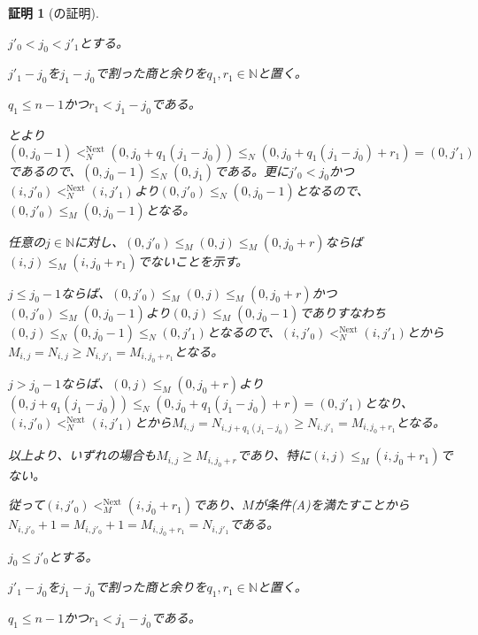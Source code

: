 \documentclass[dvipdfmx,uplatex]{jsarticle}
\theoremstyle{customnonumberbreakfortheorem}
\theoremstyle{customnonumberbreakforproof}
\newtheorem{hideableproof}{証明}
\begin{document}
\begin{hideableproof}[の証明]
\begin{indented}
\begin{indented}
			\item \(j'_0 < j_0 < j'_1\)とする。
			\begin{indented}
				\item \(j'_1-j_0\)を\(j_1-j_0\)で割った商と余りを\(q_1,r_1 \in \mathbb{N}\)と置く。
				\item \(q_1 \leq n-1\)かつ\(r_1 < j_1-j_0\)である。
				\item {}とより\((0,j_0-1) <_N^{\textrm{Next}} (0,j_0+q_1(j_1-j_0)) \leq_N (0,j_0+q_1(j_1-j_0)+r_1) = (0,j'_1)\)であるので、\((0,j_0-1) \leq_N (0,j_1)\)である。更に\(j'_0 < j_0\)かつ\((i,j'_0) <_N^{\textrm{Next}} (i,j'_1)\)より\((0,j'_0) \leq_N (0,j_0-1)\)となるので、\((0,j'_0) \leq_M (0,j_0-1)\)となる。
				\item 任意の\(j \in \mathbb{N}\)に対し、\((0,j'_0) \leq_M (0,j) \leq_M (0,j_0+r)\)ならば\((i,j) \leq_M (i,j_0+r_1)\)でないことを示す。
				\begin{indented}
					\item \(j \leq j_0-1\)ならば、\((0,j'_0) \leq_M (0,j) \leq_M (0,j_0+r)\)かつ\((0,j'_0) \leq_M (0,j_0-1)\)より\((0,j) \leq_M (0,j_0-1)\)でありすなわち\((0,j) \leq_N (0,j_0-1) \leq_N (0,j'_1)\)となるので、\((i,j'_0) <_N^{\textrm{Next}} (i,j'_1)\)とから\(M_{i,j} = N_{i,j} \geq N_{i,j'_1} = M_{i,j_0+r_1}\)となる。
					\item \(j > j_0-1\)ならば、\((0,j) \leq_M (0,j_0+r)\)より\((0,j+q_1(j_1-j_0)) \leq_N (0,j_0+q_1(j_1-j_0)+r) = (0,j'_1)\)となり、\((i,j'_0) <_N^{\textrm{Next}} (i,j'_1)\)とから\(M_{i,j} = N_{i,j+q_1(j_1-j_0)} \geq N_{i,j'_1} = M_{i,j_0+r_1}\)となる。
				\end{indented}
				\item 以上より、いずれの場合も\(M_{i,j} \geq M_{i,j_0+r}\)であり、特に\((i,j) \leq_M (i,j_0+r_1)\)でない。
				\item 従って\((i,j'_0) <_M^{\textrm{Next}} (i,j_0+r_1)\)であり、\(M\)が条件(A)を満たすことから\(N_{i,j'_0}+1 = M_{i,j'_0}+1 = M_{i,j_0+r_1} = N_{i,j'_1}\)である。
			\end{indented}
			\item
			\item \(j_0 \leq j'_0\)とする。
			\begin{indented}
				\item \(j'_1-j_0\)を\(j_1-j_0\)で割った商と余りを\(q_1,r_1 \in \mathbb{N}\)と置く。
				\item \(q_1 \leq n-1\)かつ\(r_1 < j_1-j_0\)である。

\end{indented}
\end{indented}
\end{indented}
\end{hideableproof}
\end{document}
